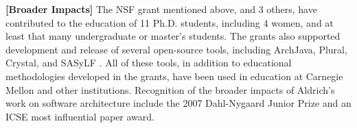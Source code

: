 \documentclass[11pt,letterpaper]{article}
\begin{document}
\textbf{[Broader Impacts]} The NSF grant mentioned above, and 3 others, have contributed to the education of 11 Ph.D. students, including 4 women, and at least that many undergraduate or master's students.  The grants also supported development and release of several open-source tools,
including ArchJava\cite{ArchJava}, Plural\cite{pluraltool}, Crystal\cite{Crystal}, and SASyLF
\cite{SASyLF}. All of these tools, in addition to educational methodologies developed in the grants, have been used in education at
Carnegie Mellon and other institutions.  Recognition of the broader impacts of
Aldrich's work on software architecture include the 2007 Dahl-Nygaard
Junior Prize and an ICSE most influential paper award.

\listoftodos
\end{document}
